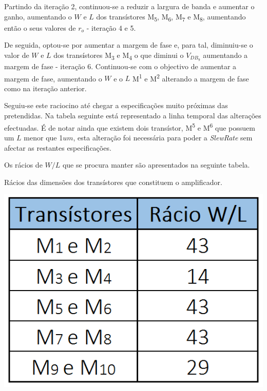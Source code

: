 \documentclass[11pt]{article}
\numberwithin{equation}{section}
\begin{document}
Partindo da iteração 2, continuou-se a reduzir a largura de banda e aumentar o ganho, aumentando o $W$ e $L$ dos transístores M\textsubscript{5}, M\textsubscript{6}, M\textsubscript{7} e M\textsubscript{8}, aumentando então o seus valores de $r_o$ -  iteração 4 e 5. 

De seguida, optou-se por aumentar a margem de fase e, para tal, diminuiu-se o valor de $W$ e $L$ dos transístores M\textsubscript{3} e M\textsubscript{4} o que diminui o $V_{DB_9}$ aumentando a margem de fase - iteração 6. Continuou-se com o objectivo de aumentar a margem de fase,  aumentando o $W$ e o $L$ M\textsuperscript{1} e M\textsuperscript{2}	alterando a margem de fase como na iteração anterior.

Seguiu-se este raciocino até chegar a especificações  muito próximas das pretendidas. Na tabela seguinte  está representado a linha temporal das alterações efectuadas. É de notar ainda que existem dois transístor, M\textsuperscript{5} e M\textsuperscript{6} que possuem um $L$ menor que 1$um$, esta alteração foi necessária para poder a \textit{SlewRate} sem afectar as restantes especificações.
         
	
Os rácios de $W/L$ que se procura manter são apresentados na seguinte tabela.

\begin{table}[H]
	\centering
	\caption{Rácios das dimensões dos transístores que constituem o amplificador.}
	\vspace{-1.5mm}
	\includegraphics[keepaspectratio=true, scale=0.33]{teoricas/racios}
\end{table}
\end{document}
